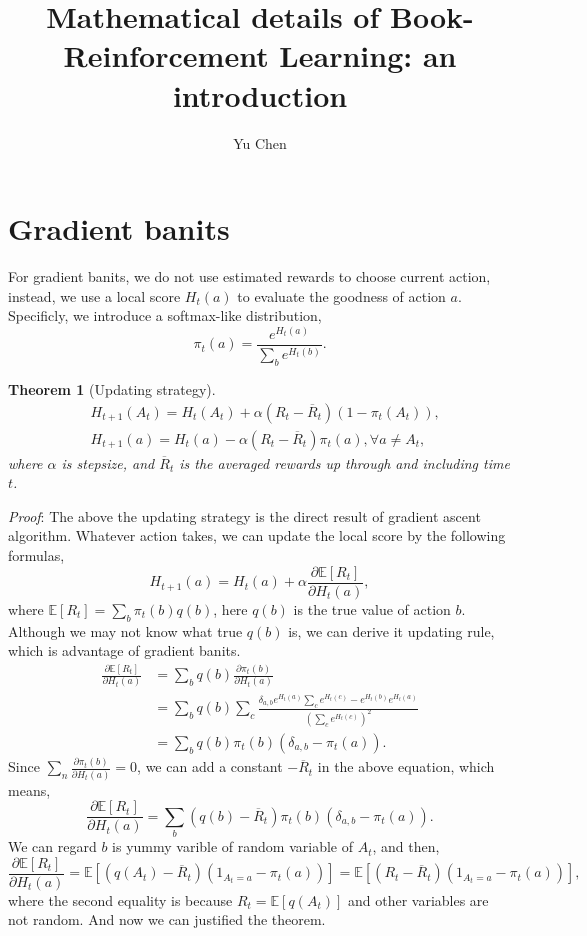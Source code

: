 \documentclass[11pt,a4paper]{article}
\title{Mathematical details of Book-Reinforcement Learning: an introduction}
\author{Yu Chen}
\affiliation{The Chinese University of HongKong, Department of Mechanical and Automation Engineering}
\def\bar{\overline}
\def\E{\mathbb{E}}
\newtheorem{theorem}{Theorem}[subsection]
\begin{document}
\maketitle
\section{Gradient banits}
For gradient banits, we do not use estimated rewards to choose current action, instead, we use a local score $H_t(a)$ to evaluate the goodness of action $a$. Specificly, we introduce a softmax-like distribution,
\begin{equation}
\pi_t(a) = \frac{e^{H_t(a)}}{\sum_b e^{H_t(b)}}.
\end{equation}
\begin{theorem}[Updating strategy]
\begin{eqnarray}
 & H_{t+1}(A_t) = H_t(A_t) + \alpha(R_t-\bar{R}_t)(1-\pi_t(A_t)), \\ & H_{t+1}(a) = H_t(a) - \alpha(R_t-\bar{R}_t)\pi_t(a),\forall a \neq A_t, 
\end{eqnarray}
where $\alpha$ is stepsize, and $\bar{R}_t$ is the averaged rewards up through and including time $t$.
\end{theorem}
\emph{Proof}: The above the updating strategy is the direct result of gradient ascent algorithm. Whatever action takes, we can update the local score by the following formulas,
\begin{equation}
H_{t+1}(a) = H_t(a) + \alpha \frac{\partial\E[R_{t}]}{\partial {H_t(a)}},
\end{equation}
where $\E[R_t] = \sum_b \pi_t(b)q(b)$, here $q(b)$ is the true value of action $b$. Although we may not know what true $q(b)$ is, we can derive it updating rule, which is advantage of gradient banits.
\begin{align}
\frac{\partial\E[R_{t}]}{\partial {H_t(a)}} & = \sum_b q(b) \frac{\partial \pi_t(b)}{\partial H_t(a)} \\ & = \sum_b q(b) \sum_{c}\frac{\delta_{a,b}e^{H_t(a)}\sum_{c}e^{H_t(c)}-e^{H_t(b)}e^{H_t(a)}}{(\sum_{c}e^{H_t(c)})^2} \\ & = \sum_{b} q(b) \pi_t(b)(\delta_{a,b} - \pi_t(a)).
\end{align}
Since $\sum_n \frac{\partial\pi_t(b)}{\partial {H_t(a)}} = 0$, we can add a constant $-\bar{R}_t$ in the above equation, which means,
\begin{equation}
\frac{\partial\E[R_{t}]}{\partial {H_t(a)}} = \sum_b (q(b) - \bar{R}_t)\pi_t(b)(\delta_{a,b} - \pi_t(a)).
\end{equation}
We can regard $b$ is yummy varible of random variable of $A_t$, and then,
\begin{equation}
\frac{\partial\E[R_{t}]}{\partial {H_t(a)}} = \E[(q(A_t)-\bar{R}_t)(1_{A_t=a}-\pi_t(a))] = \E[(R_t-\bar{R}_t)(1_{A_t=a}-\pi_t(a))],
\end{equation}
where the second equality is because $R_t = \E[q(A_t)]$ and other variables are not random. And now we can justified the theorem.
\end{document}
